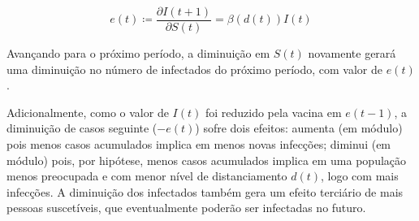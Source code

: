 \documentclass[
    article,
	12pt,				%
	oneside,			%
	a4paper,			%
	english,			%
	brazil,				%
	hyperref = {colorlinks, citecolor=c1d, linkcolor=c2d, urlcolor=c3d, colorlinks}
	]{abntex2}
\begin{document}
$$e(t) \coloneqq \frac{\partial I(t+1)}{\partial S(t)} = \beta(d(t))I(t)$$

Avançando para o próximo período, a diminuição em $S(t)$ novamente gerará uma diminuição no número de infectados do próximo período, com valor de $e(t)$.

Adicionalmente, como o valor de $I(t)$ foi reduzido pela vacina em $e(t-1)$, a diminuição de casos seguinte ($-e(t)$) sofre dois efeitos: aumenta (em módulo) pois menos casos acumulados implica em menos novas infecções; diminui (em módulo) pois, por hipótese, menos casos acumulados implica em uma população menos preocupada e com menor nível de distanciamento $d(t)$, logo com mais infecções. A diminuição dos infectados também gera um efeito terciário de mais pessoas suscetíveis, que eventualmente poderão ser infectadas no futuro.
\end{document}
